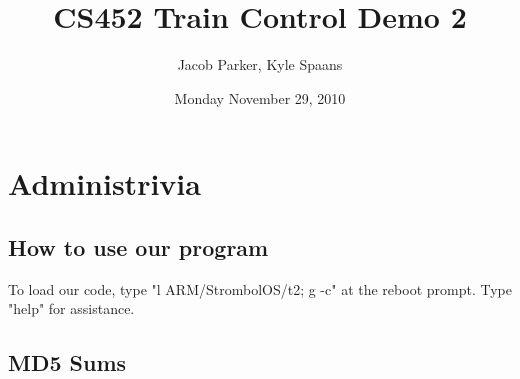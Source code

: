 \documentclass{article}
\title{CS452 Train Control Demo 2}
\author{Jacob Parker, Kyle Spaans}
\date{Monday November 29, 2010}
\begin{document}
\maketitle

\section{Administrivia}
\subsection{How to use our program}
To load our code, type "l ARM/StrombolOS/t2; g -c" at the reboot prompt.
Type "help" for assistance.

\subsection{MD5 Sums}
\end{document}

